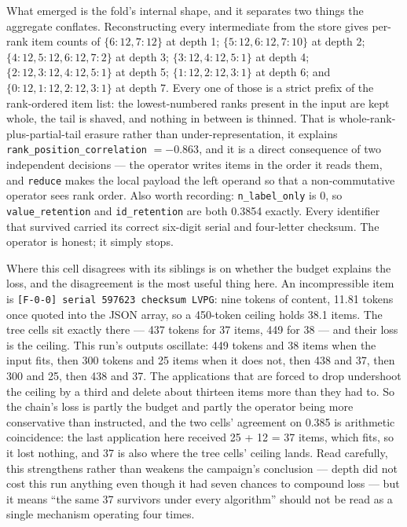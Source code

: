 \documentclass[11pt]{article}
\begin{document}
What emerged is the fold's internal shape, and it separates two things the aggregate
conflates. Reconstructing every intermediate from the store gives per-rank item counts of
$\{6\!:\!12, 7\!:\!12\}$ at depth 1; $\{5\!:\!12, 6\!:\!12, 7\!:\!10\}$ at depth 2;
$\{4\!:\!12, 5\!:\!12, 6\!:\!12, 7\!:\!2\}$ at depth 3;
$\{3\!:\!12, 4\!:\!12, 5\!:\!1\}$ at depth 4;
$\{2\!:\!12, 3\!:\!12, 4\!:\!12, 5\!:\!1\}$ at depth 5;
$\{1\!:\!12, 2\!:\!12, 3\!:\!1\}$ at depth 6; and
$\{0\!:\!12, 1\!:\!12, 2\!:\!12, 3\!:\!1\}$ at depth 7. Every one of those is a strict
prefix of the rank-ordered item list: the lowest-numbered ranks present in the input are
kept whole, the tail is shaved, and nothing in between is thinned. That is
whole-rank-plus-partial-tail erasure rather than under-representation, it explains
\texttt{rank\_position\_correlation} $=-0.863$, and it is a direct consequence of two
independent decisions --- the operator writes items in the order it reads them, and
\texttt{reduce} makes the local payload the left operand so that a non-commutative operator
sees rank order. Also worth recording: \texttt{n\_label\_only} is 0, so
\texttt{value\_retention} and \texttt{id\_retention} are both 0.3854 exactly. Every
identifier that survived carried its correct six-digit serial and four-letter checksum.
The operator is honest; it simply stops.

Where this cell disagrees with its siblings is on whether the budget explains the loss, and
the disagreement is the most useful thing here. An incompressible item is
\texttt{[F-0-0] serial 597623 checksum LVPG}: nine tokens of content, 11.81 tokens once
quoted into the JSON array, so a 450-token ceiling holds 38.1 items. The tree cells sit
exactly there --- 437 tokens for 37 items, 449 for 38 --- and their loss is the ceiling.
This run's outputs oscillate: 449 tokens and 38 items when the input fits, then 300 tokens
and 25 items when it does not, then 438 and 37, then 300 and 25, then 438 and 37. The
applications that are forced to drop undershoot the ceiling by a third and delete about
thirteen items more than they had to. So the chain's loss is partly the budget and partly
the operator being more conservative than instructed, and the two cells' agreement on 0.385
is arithmetic coincidence: the last application here received 25 + 12 = 37 items, which
fits, so it lost nothing, and 37 is also where the tree cells' ceiling lands. Read
carefully, this strengthens rather than weakens the campaign's conclusion --- depth did not
cost this run anything even though it had seven chances to compound loss --- but it means
``the same 37 survivors under every algorithm'' should not be read as a single mechanism
operating four times.
\end{document}
